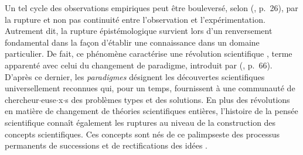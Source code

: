 Un tel cycle des observations empiriques peut être bouleversé, selon \citeauthor{bachelard1934formation} (\citeyear{bachelard1934formation}, p.~26), par la \og{}rupture et non pas continuité entre l'observation et l'expérimentation\fg{}. Autrement dit, la rupture épistémologique survient lors d'un renversement fondamental dans la façon d'établir une connaissance dans un domaine particulier. De fait, ce phénomène caractérise une \og{}révolution scientifique\fg{} \citep[p.~2]{koyre1957closed}, terme apparenté avec celui du \og{}changement de paradigme\fg{}, introduit par \citeauthor{kuhn1962structure} (\citeyear{kuhn1962structure}, p.~66). D'après ce dernier, les \textit{paradigmes} désignent les \og{}découvertes scientifiques universellement reconnues qui, pour un temps, fournissent à une communauté de chercheur$\cdot$euse$\cdot$x$\cdot$s des problèmes types et des solutions\fg{}. En plus des révolutions en matière de changement de théories scientifiques entières, l'histoire de la pensée scientifique connaît également les ruptures au niveau de la construction des concepts scientifiques. Ces concepts sont nés de ce palimpseste des processus permanents de successions et de rectifications des idées \citep[p.~24]{astolfi2008chapitre}. 

